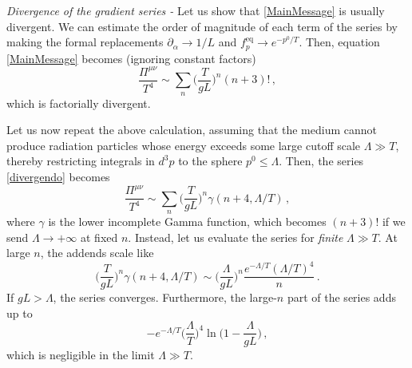 \documentclass[a4paper, amsfonts, amssymb, amsmath, reprint, showkeys, twoside,notitlepage]{revtex4-2}
\begin{document}
\textit{Divergence of the gradient series -} Let us show that \eqref{MainMessage} is usually divergent. We can estimate the order of magnitude of each term of the series by making the formal replacements $\partial_\alpha \rightarrow 1/L$ and $f_{p}^{\text{eq}}\rightarrow e^{-p^0/T}$. Then, equation \eqref{MainMessage} becomes (ignoring constant factors)
\begin{equation}\label{divergendo}
    \dfrac{\Pi^{\mu \nu}}{T^4} \sim \sum_{n}  \bigg( \dfrac{T}{gL}\bigg)^n (n{+}3)! \, ,
\end{equation}
which is factorially divergent. 

Let us now repeat the above calculation, assuming that the medium cannot produce radiation particles whose energy exceeds some large cutoff scale $\Lambda \gg T$, thereby restricting integrals in $d^3 p$ to the sphere $p^0 \leq \Lambda$. Then, the series \eqref{divergendo} becomes
\begin{equation}
   \dfrac{\Pi^{\mu \nu}}{T^4} \sim \sum_n \bigg( \dfrac{T}{gL}\bigg)^n \gamma(n{+}4,\Lambda/T) \, ,
\end{equation}
where $\gamma$ is the lower incomplete Gamma function, which becomes $(n+3)!$ if we send $\Lambda\rightarrow +\infty$ at fixed $n$. Instead, let us evaluate the series for \textit{finite} $\Lambda \gg T$. At large $n$, the addends scale like
\begin{equation}
   \bigg( \dfrac{T}{gL}\bigg)^n \gamma(n{+}4,\Lambda/T) \sim  \bigg( \dfrac{\Lambda}{gL}\bigg)^n \dfrac{e^{-\Lambda/T}(\Lambda/T)^4}{n} \, . 
\end{equation}
If $gL>\Lambda$, the series converges. Furthermore, the large-$n$ part of the series adds up to
\begin{equation}\label{estimiamo}
   - e^{-\Lambda/T}\bigg( \dfrac{\Lambda}{T} \bigg)^4\ln\bigg(1-\dfrac{\Lambda}{gL}\bigg) \, ,
\end{equation}
which is negligible in the limit $\Lambda \gg T$.
\end{document}
